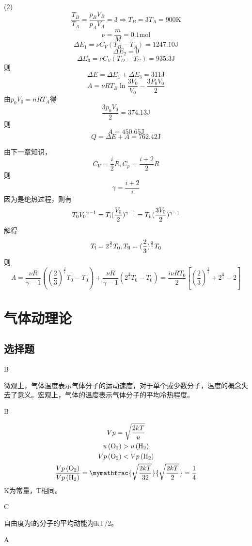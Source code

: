 \documentclass[b5paper,opensource]{./template/qyxf-book}
\newcommand{\RNum}[1]{\uppercase\expandafter{\romannumeral #1\relax}}%
\begin{document}
(2)
\[\frac{{{T_B}}}{{{T_A}}} = \frac{{{p_B}{V_B}}}{{{p_A}{V_A}}} = 3 \Rightarrow {T_B} = 3{T_A} = 900\mathrm{K}\]
\[\nu  = \frac{m}{M} = 0.1\mathrm{mol}\]
\[\Delta {E_1} = \nu {C_V}({T_B} - {T_A}) = 1247.10\mathrm{J}\]
\[\Delta {E_2} = 0\]
\[\Delta {E_3} = \nu {C_V}({T_D} - {T_C}) = 935.3\mathrm{J}\]
则\[\Delta E = \Delta {E_1} + \Delta {E_3} = 311\mathrm{J}\]
\[A = \nu R{T_B}\ln \frac{{3{V_0}}}{{{V_0}}} - \frac{{3P_0V_0}}{2}\]
由${p_0}{V_0} = nR{T_A}$得\[\frac{{3{p_0}{V_0}}}{2} = 374.13\mathrm{J}\]
则\[A = 450.65\mathrm{J}\]
\[Q = \Delta E + A = 762.42\mathrm{J}\]

\solve 由下一章知识，\[{C_V} = \frac{i}{2}R,{C_p} = \frac{{i + 2}}{2}R\]
则
\[\gamma=\frac{{i + 2}}{i}\]
因为是绝热过程，则有
\[{T_0}{V_0}^{\gamma-1}={T_\text{\RNum{1}}}{(\frac{V_0}{2})^{\gamma-1}}= {T_\text{\RNum{2}}}{(\frac{{3{V_0}}}{2})^{\gamma-1}}\]
解得
\[{T_\text{\RNum{1}}} = {2^{\frac{2}{i}}}{T_0},{T_\text{\RNum{2}}} = {(\frac{2}{3})^{\frac{2}{i}}}{T_0}\]
则
\[A = \frac{{\nu R}}{{\gamma-1}}({(\frac{2}{3})^{\frac{2}{i}}}{T_0} - {T_0}) + \frac{{\nu R}}{{\gamma  - 1}}({2^{\frac{2}{i}}}{T_0} - {T_0}) = \frac{{i\nu R{T_0}}}{2}[{(\frac{2}{3})^{\frac{2}{i}}} + {2^{\frac{2}{i}}} - 2]\]

\chapter{气体动理论}
\section{选择题}
B

\solve 微观上，气体温度表示气体分子的运动速度，对于单个或少数分子，温度的概念失去了意义。宏观上，气体的温度表示气体分子的平均冷热程度。

B

\solve
\begin{gather*} 
{Vp=\sqrt{\frac{2kT}{u}}}\\
{u\left(\ce{O2}\right)}>u\left(\ce{H2}\right)\\
{Vp\left(\ce{O2}\right)<Vp\left(\ce{H2}\right) } \\
\frac{Vp\left(\ce{O2}\right)}{Vp\left(\ce{H2}\right)}=\mymathfrac{\sqrt{\frac{2kT}{32}}} {\sqrt{\frac{2kT}{2}}}=\frac{1}{4}
\end{gather*}
K为常量，T相同。

C

\solve 自由度为i的分子的平均动能为ikT/2。

A
\end{document}
